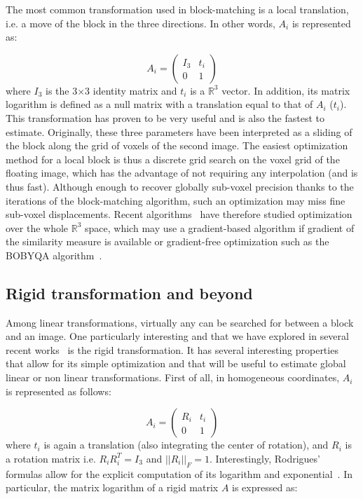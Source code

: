 \documentclass[a4paper]{article}
\begin{document}
The most common transformation used in block-matching is a local translation, i.e. a move of the block in the three directions. In other words, $A_i$ is represented as:

\begin{equation}
	A_i = \begin{pmatrix} I_3 & t_i \\ 0 & 1 \end{pmatrix}
\end{equation}
where $I_3$ is the 3$\times$3 identity matrix and $t_i$ is a $\mathbb{R}^3$ vector. In addition, its matrix logarithm is defined as a null matrix with a translation equal to that of $A_i$ ($t_i$). This transformation has proven to be very useful and is also the fastest to estimate. Originally, these three parameters have been interpreted as a sliding of the block along the grid of voxels of the second image. The easiest optimization method for a local block is thus a discrete grid search on the voxel grid of the floating image, which has the advantage of not requiring any interpolation (and is thus fast). Although enough to recover globally sub-voxel precision thanks to the iterations of the block-matching algorithm, such an optimization may miss fine sub-voxel displacements. Recent algorithms~\cite{commowick:inserm-00681610} have therefore studied optimization over the whole $\mathbb{R}^3$ space, which may use a gradient-based algorithm if gradient of the similarity measure is available or gradient-free optimization such as the BOBYQA algorithm~\cite{Powell09a}.

\subsection{Rigid transformation and beyond}

Among linear transformations, virtually any can be searched for between a block and an image. One particularly interesting and that we have explored in several recent works~\cite{commowick:inserm-00681610,Commowick_Miccai_2012} is the rigid transformation. It has several interesting properties that allow for its simple optimization and that will be useful to estimate global linear or non linear transformations. First of all, in homogeneous coordinates, $A_i$ is represented as follows:

\begin{equation}
	A_i = \begin{pmatrix} R_i & t_i \\ 0 & 1 \end{pmatrix}
\end{equation}
where $t_i$ is again a translation (also integrating the center of rotation), and $R_i$ is a rotation matrix i.e. $R_i R_i^T = I_3$ and $|| R_i ||_F = 1$. Interestingly, Rodrigues' formulas allow for the explicit computation of its logarithm and exponential~\cite{blanco2010tutorial}. In particular, the matrix logarithm of a rigid matrix $A$ is expressed as:
\end{document}
